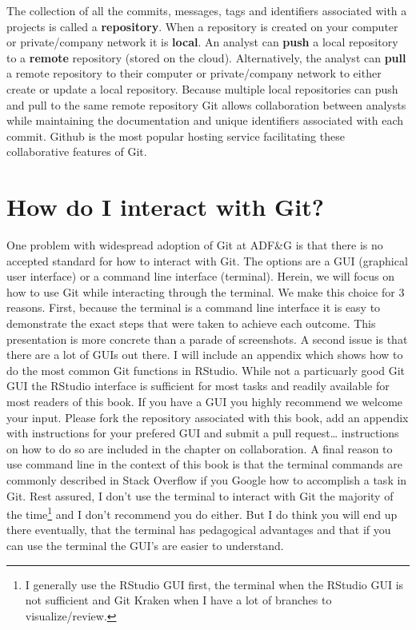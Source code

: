 \documentclass[
  letterpaper,
  DIV=11,
  numbers=noendperiod]{scrreprt}
\begin{document}
The collection of all the commits, messages, tags and identifiers
associated with a projects is called a \textbf{repository}. When a
repository is created on your computer or private/company network it is
\textbf{local}. An analyst can \textbf{push} a local repository to a
\textbf{remote} repository (stored on the cloud). Alternatively, the
analyst can \textbf{pull} a remote repository to their computer or
private/company network to either create or update a local repository.
Because multiple local repositories can push and pull to the same remote
repository Git allows collaboration between analysts while maintaining
the documentation and unique identifiers associated with each commit.
Github is the most popular hosting service facilitating these
collaborative features of Git.

\hypertarget{how-do-i-interact-with-git}{%
\section{How do I interact with Git?}\label{how-do-i-interact-with-git}}

One problem with widespread adoption of Git at ADF\&G is that there is
no accepted standard for how to interact with Git. The options are a GUI
(graphical user interface) or a command line interface (terminal).
Herein, we will focus on how to use Git while interacting through the
terminal. We make this choice for 3 reasons. First, because the terminal
is a command line interface it is easy to demonstrate the exact steps
that were taken to achieve each outcome. This presentation is more
concrete than a parade of screenshots. A second issue is that there are
a lot of GUIs out there. I will include an appendix which shows how to
do the most common Git functions in RStudio. While not a particuarly
good Git GUI the RStudio interface is sufficient for most tasks and
readily available for most readers of this book. If you have a GUI you
highly recommend we welcome your input. Please fork the repository
associated with this book, add an appendix with instructions for your
prefered GUI and submit a pull request\ldots{} instructions on how to do
so are included in the chapter on collaboration. A final reason to use
command line in the context of this book is that the terminal commands
are commonly described in Stack Overflow if you Google how to accomplish
a task in Git. Rest assured, I don't use the terminal to interact with
Git the majority of the time\footnote{I generally use the RStudio GUI
  first, the terminal when the RStudio GUI is not sufficient and Git
  Kraken when I have a lot of branches to visualize/review.} and I don't
recommend you do either. But I do think you will end up there
eventually, that the terminal has pedagogical advantages and that if you
can use the terminal the GUI's are easier to understand.
\end{document}
